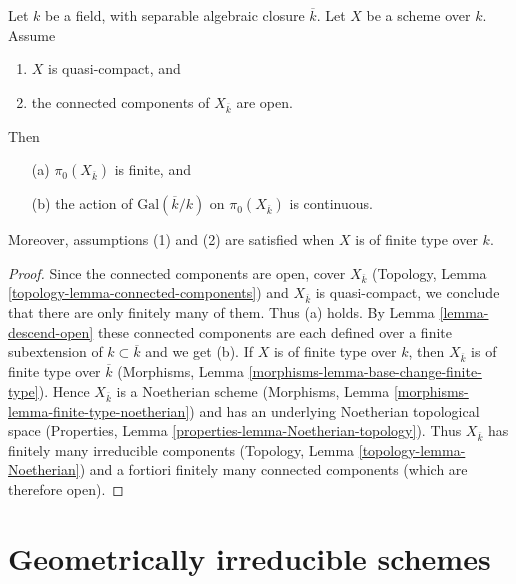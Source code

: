 \begin{lemma}
\label{lemma-galois-action-connected-components-continuous}
Let $k$ be a field, with separable algebraic closure $\overline{k}$.
Let $X$ be a scheme over $k$.
Assume
\begin{enumerate}
\item $X$ is quasi-compact, and
\item the connected components of $X_{\overline{k}}$ are open.
\end{enumerate}
Then
\begin{enumerate}
\item[(a)] $\pi_0(X_{\overline{k}})$ is finite, and
\item[(b)] the action of $\text{Gal}(\overline{k}/k)$ on
$\pi_0(X_{\overline{k}})$ is continuous.
\end{enumerate}
Moreover, assumptions (1) and (2) are satisfied when $X$ is
of finite type over $k$.
\end{lemma}

\begin{proof}
Since the connected components are open, cover $X_{\overline{k}}$
(Topology, Lemma \ref{topology-lemma-connected-components}) and
$X_{\overline{k}}$ is quasi-compact, we conclude that there are only
finitely many of them. Thus (a) holds.
By Lemma \ref{lemma-descend-open} these connected components
are each defined over a finite subextension of $k \subset \overline{k}$
and we get (b).
If $X$ is of finite type over $k$, then $X_{\overline{k}}$ is of finite
type over $\overline{k}$
(Morphisms, Lemma \ref{morphisms-lemma-base-change-finite-type}).
Hence $X_{\overline{k}}$ is a Noetherian scheme
(Morphisms, Lemma \ref{morphisms-lemma-finite-type-noetherian}) and has
an underlying Noetherian topological space
(Properties, Lemma \ref{properties-lemma-Noetherian-topology}).
Thus $X_{\overline{k}}$ has finitely many irreducible components
(Topology, Lemma \ref{topology-lemma-Noetherian})
and a fortiori finitely many connected components (which are
therefore open).
\end{proof}









\section{Geometrically irreducible schemes}
\label{section-geometrically-irreducible}

